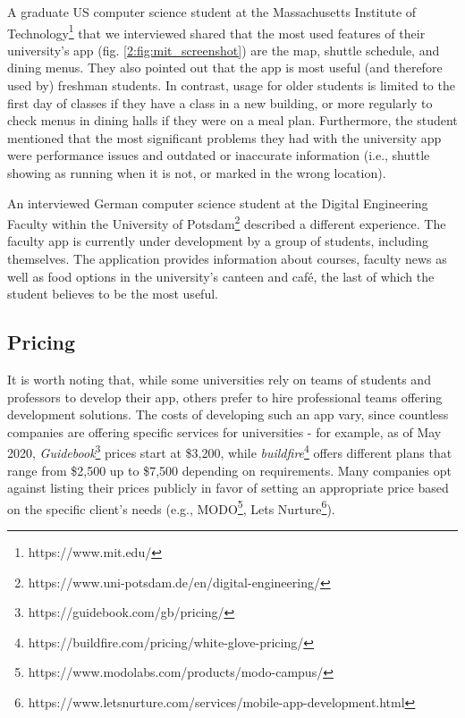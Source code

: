         A graduate US computer science student at the Massachusetts Institute of Technology\footnote{https://www.mit.edu/} that we interviewed shared that the most used features of their university's app (fig. \ref{2:fig:mit_screenshot}) are the map, shuttle schedule, and dining menus. They also pointed out that the app is most useful (and therefore used by) freshman students. In contrast, usage for older students is limited to the first day of classes if they have a class in a new building, or more regularly to check menus in dining halls if they were on a meal plan. Furthermore, the student mentioned that the most significant problems they had with the university app were performance issues and outdated or inaccurate information (i.e., shuttle showing as running when it is not, or marked in the wrong location).
        
        An interviewed German computer science student at the Digital Engineering Faculty within the University of Potsdam\footnote{https://www.uni-potsdam.de/en/digital-engineering/} described a different experience. The faculty app is currently under development by a group of students, including themselves. The application provides information about courses, faculty news as well as food options in the university's canteen and café, the last of which the student believes to be the most useful.
        
    \subsection{Pricing} \label{2:uni_apps_pricing}
    
        It is worth noting that, while some universities rely on teams of students and professors to develop their app, others prefer to hire professional teams offering development solutions. The costs of developing such an app vary, since countless companies are offering specific services for universities - for example, as of May 2020, \textit{Guidebook}\footnote{https://guidebook.com/gb/pricing/} prices start at \$3,200, while \textit{buildfire}\footnote{https://buildfire.com/pricing/white-glove-pricing/} offers different plans that range from \$2,500 up to \$7,500 depending on requirements. Many companies opt against listing their prices publicly in favor of setting an appropriate price based on the specific client's needs (e.g., MODO\footnote{https://www.modolabs.com/products/modo-campus/}, Lets Nurture\footnote{https://www.letsnurture.com/services/mobile-app-development.html}).

